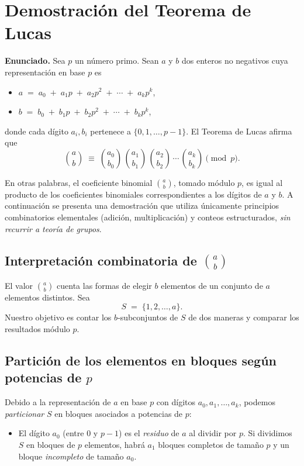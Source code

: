 \documentclass{article}
\begin{document}
\section*{Demostración del Teorema de Lucas}

\textbf{Enunciado.} Sea $p$ un número primo. Sean $a$ y $b$ dos enteros no negativos cuya representación en base $p$ es
\begin{itemize}
  \item $a \;=\; a_0 \;+\; a_1 p \;+\; a_2 p^{2} \;+\; \cdots \;+\; a_k p^{k}$,
  \item $b \;=\; b_0 \;+\; b_1 p \;+\; b_2 p^{2} \;+\; \cdots \;+\; b_k p^{k}$,
\end{itemize}
donde cada dígito $a_i, b_i$ pertenece a $\{0,1,\ldots,p-1\}$.  
El Teorema de Lucas afirma que
\[
\binom{a}{b}\;\equiv\;
\binom{a_0}{b_0}\,
\binom{a_1}{b_1}\,
\binom{a_2}{b_2}\,\cdots\,
\binom{a_k}{b_k}
\pmod{p}.
\]

En otras palabras, el coeficiente binomial $\binom{a}{b}$, tomado módulo $p$, es igual al producto de los coeficientes binomiales correspondientes a los dígitos de $a$ y $b$.  
A continuación se presenta una demostración que utiliza únicamente principios combinatorios elementales (adición, multiplicación) y conteos estructurados, \emph{sin recurrir a teoría de grupos}.

\subsection*{Interpretación combinatoria de $\binom{a}{b}$}

El valor $\binom{a}{b}$ cuenta las formas de elegir $b$ elementos de un conjunto de $a$ elementos distintos. Sea
\[S \;=\; \{1,2,\ldots,a\}.\]
Nuestro objetivo es contar los $b$‑subconjuntos de $S$ de dos maneras y comparar los resultados módulo $p$.

\subsection*{Partición de los elementos en bloques según potencias de $p$}

Debido a la representación de $a$ en base $p$ con dígitos $a_0,a_1,\ldots,a_k$, podemos \emph{particionar} $S$ en bloques asociados a potencias de $p$:

\begin{itemize}
  \item El dígito $a_0$ (entre $0$ y $p-1$) es el \emph{residuo} de $a$ al dividir por $p$.  
        Si dividimos $S$ en bloques de $p$ elementos, habrá $a_1$ bloques completos de tamaño $p$ y un bloque \emph{incompleto} de tamaño $a_0$.
\end{itemize}
\end{document}
